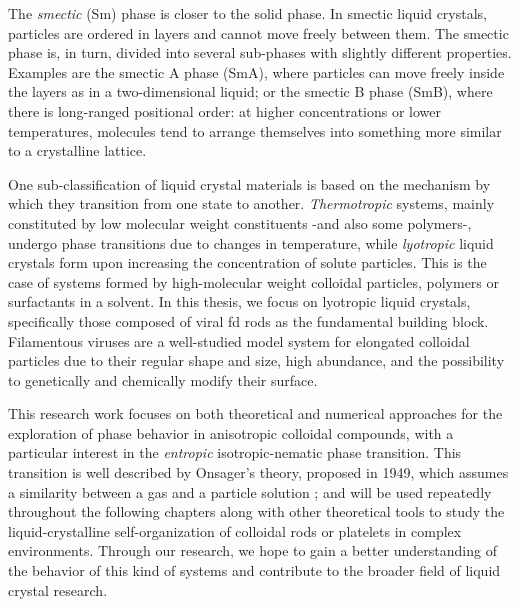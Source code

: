 The {\em smectic} (Sm) phase is closer to the solid phase. In smectic liquid crystals, particles are ordered in layers and cannot move freely between them. The smectic phase is, in turn, divided into several sub-phases with slightly different properties. Examples are the smectic A phase (SmA), where particles can move freely inside the layers as in a two-dimensional liquid; or the smectic B phase (SmB), where there is long-ranged positional order: at higher concentrations or lower temperatures, molecules tend to arrange themselves into something more similar to a crystalline lattice.

One sub-classification of liquid crystal materials is based on the mechanism by which they transition from one state to another. {\em Thermotropic} systems, mainly constituted by low molecular weight constituents -and also some polymers-, undergo phase transitions due to changes in temperature, while {\em lyotropic} liquid crystals form upon increasing the concentration of solute particles. This is the case of systems formed by high-molecular weight colloidal particles, polymers or surfactants in a solvent. In this thesis, we focus on lyotropic liquid crystals, specifically those composed of viral fd rods as the fundamental building block. Filamentous viruses are a well-studied model system for elongated colloidal particles due to their regular shape and size, high abundance, and the possibility to genetically and chemically modify their surface.

This research work focuses on both theoretical and numerical approaches for the exploration of phase behavior in anisotropic colloidal compounds, with a particular interest in the {\em entropic} isotropic-nematic phase transition. This transition is well described by Onsager's theory, proposed in 1949, which assumes a similarity between a gas and a particle solution \cite{onsager1949}; and will be used repeatedly throughout the following chapters along with other theoretical tools to study the liquid-crystalline self-organization of colloidal rods or platelets in complex environments. Through our research, we hope to gain a better understanding of the behavior of this kind of systems and contribute to the broader field of liquid crystal research.

